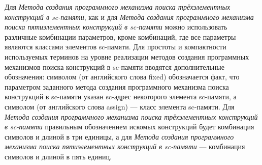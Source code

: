 Для \textit{Метода создания программного механизма поиска трёхэлементных конструкций в sc-памяти}, как и для \textit{Метода создания программного механизма поиска пятиэлементных конструкций в sc-памяти} можно использовать различные комбинации параметров, кроме комбинаций, где все параметры являются классами элементов sc-памяти. Для простоты и компактности используемых терминов на уровне реализации методов создания программных механизмов поиска конструкций в sc-памяти вводятся дополнительные обозначения: символом  (от английского слова fixed) обозначается факт, что параметром заданного метода создания программного механизма поиска конструкций в sc-памяти указан sc-адрес некоторого элемента sc-памяти, а символом  (от английского слова assign) --- класс элемента sc-памяти. Для \textit{Метода создания программного механизма поиска трёхэлементных конструкций в sc-памяти} правильным обозначением искомых конструкций будет комбинация символов  и  длиной в три единицы, а для \textit{Метода создания программного механизма поиска пятиэлементных конструкций в sc-памяти} --- комбинация символов  и  длиной в пять единиц.

